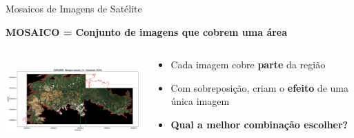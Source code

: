 \documentclass[aspectratio=169,11pt]{beamer}
\begin{document}
\begin{frame}{Mosaicos de Imagens de Satélite}
\vspace{-0.6cm}
\begin{center}
    \colorbox{ufal!10}{\parbox{0.8\textwidth}{\centering\textbf{\color{ufal}MOSAICO = Conjunto de imagens que cobrem uma área}}}
\end{center}

\vspace{0.2cm}
\begin{columns}[T,onlytextwidth]
    \begin{column}{0.55\textwidth}
        \includegraphics[width=\textwidth,height=3.2cm,keepaspectratio]{img/mosaic_example.jpg}
    \end{column}
    \begin{column}{0.45\textwidth}
        \begin{itemize}
            \item Cada imagem cobre \textbf{parte} da região
            \vspace{0.2cm}
            \item Com sobreposição, criam o \textbf{efeito} de uma única imagem
            \vspace{0.2cm}
            \item \textbf{\color{accent}Qual a melhor combinação escolher?}
        \end{itemize}
        
        \vspace{0.4cm}
        \begin{center}
        \end{center}
    \end{column}
\end{columns}
\end{frame}
\end{document}
